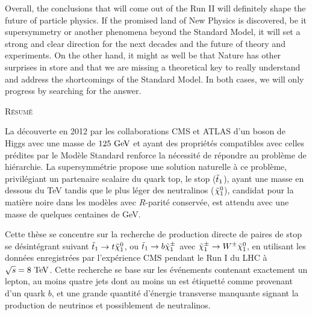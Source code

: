 Overall, the conclusions that will come out of the Run II will definitely shape the future
of particle physics. If the promised land of New Physics is discovered, be it supersymmetry
or another phenomena beyond the Standard Model, it will set a strong and clear direction
for the next decades and the future of theory and experiments. On the other hand, it might
as well be that Nature has other surprises in store and that we are missing a theoretical
key to really understand and address the shortcomings of the Standard Model. In both
cases, we will only progress by searching for the answer.

\emptypage


\renewcommand{\leftmark}{Bibliography}

\begin{thebibliography}{2}

\singlespace



\end{thebibliography}

\newpage
\thispagestyle{empty}
\singlespace
\begin{center}\textsc{Résumé}\end{center}
    \vspace*{-0.2cm}
    La découverte en 2012 par les collaborations CMS et ATLAS d'un boson de Higgs avec une
masse de $125~\text{GeV}$ et ayant des propriétés compatibles avec celles prédites par le
Modèle Standard renforce la nécessité de répondre au problème de hiérarchie. La
supersymmétrie propose une solution naturelle à ce problème, privilégiant un
partenaire scalaire du quark top, le stop ($\tilde{t}_1$), ayant une masse en dessous du
TeV tandis que le plus léger des neutralinos ($\tilde{\chi}_1^0$), candidat pour
la matière noire dans les modèles avec $R$-parité conservée, est attendu avec une masse
de quelques centaines de GeV.

    Cette thèse se concentre sur la recherche de production directe de paires de stop
se désintégrant suivant $\tilde{t}_1 \rightarrow t \tilde{\chi}_1^0$, ou $\tilde{t}_1 \rightarrow b
\tilde{\chi}_1^\pm$ avec $\tilde{\chi}_1^\pm \rightarrow W^\pm \tilde{\chi}_1^0$, en utilisant les données
enregistrées par l'expérience CMS pendant le Run I du LHC à $\sqrt{s} = 8~\text{TeV}$. Cette recherche
se base sur les événements contenant exactement un lepton, au moins quatre jets dont au moins
un est étiquetté comme provenant d'un quark $b$, et une grande quantité d'énergie transverse
manquante signant la production de neutrinos et possiblement de neutralinos.

